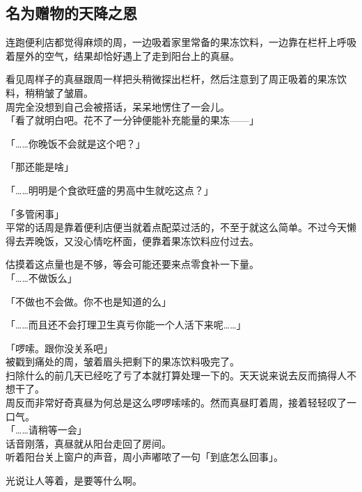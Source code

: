\subsection{名为赠物的天降之恩}

连跑便利店都觉得麻烦的周，一边吸着家里常备的果冻饮料，一边靠在栏杆上呼吸着屋外的空气，结果却恰好遇上了走到阳台上的真昼。

看见周样子的真昼跟周一样把头稍微探出栏杆，然后注意到了周正吸着的果冻饮料，稍稍皱了皱眉。\\

周完全没想到自己会被搭话，呆呆地愣住了一会儿。\\

「看了就明白吧。花不了一分钟便能补充能量的果冻——」

「……你晚饭不会就是这个吧？」

「那还能是啥」

「……明明是个食欲旺盛的男高中生就吃这点？」

「多管闲事」\\

平常的话周是靠着便利店便当就着点配菜过活的，不至于就这么简单。不过今天懒得去弄晚饭，又没心情吃杯面，便靠着果冻饮料应付过去。

估摸着这点量也是不够，等会可能还要来点零食补一下量。\\

「……不做饭么」

「不做也不会做。你不也是知道的么」

「……而且还不会打理卫生真亏你能一个人活下来呢……」

「啰嗦。跟你没关系吧」\\

被戳到痛处的周，皱着眉头把剩下的果冻饮料吸完了。\\

扫除什么的前几天已经吃了亏了本就打算处理一下的。天天说来说去反而搞得人不想干了。\\

周反而非常好奇真昼为何总是这么啰啰嗦嗦的。然而真昼盯着周，接着轻轻叹了一口气。\\

「……请稍等一会」\\

话音刚落，真昼就从阳台走回了房间。\\

听着阳台关上窗户的声音，周小声嘟哝了一句「到底怎么回事」。

光说让人等着，是要等什么啊。\\

